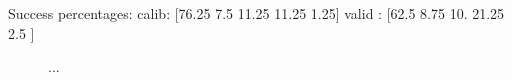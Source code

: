 \documentclass[draft]{agujournal2019}
\begin{document}
Success percentages:
calib: [76.25  7.5  11.25 11.25  1.25]
valid : [62.5   8.75 10.   21.25  2.5 ]

\begin{figure}
	\noindent{}
	\caption{...}
	\label{fig_mutation_operators_perfs}
\end{figure}



%
%

%

%
\end{document}
